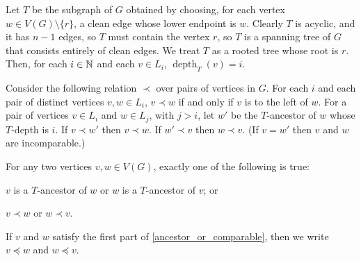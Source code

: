 \documentclass{patmorin}
\DeclareMathOperator{\depth}{depth}
\DeclareMathOperator{\pth}{path}
\begin{document}
Let $T$ be the subgraph of $G$ obtained by choosing, for each vertex $w\in V(G)\setminus\{r\}$, a clean edge whose lower endpoint is $w$.  Clearly $T$ is acyclic, and it has $n-1$ edges, so $T$ must contain the vertex $r$, so $T$ is a spanning tree of $G$ that consists entirely of clean edges.  We treat $T$ as a rooted tree whose root is $r$.  Then, for each $i\in\mathbb{N}$ and each $v\in L_i$, $\depth_T(v)=i$.


Consider the following relation $\prec$ over pairs of vertices in $G$. For each $i$ and each pair of distinct vertices $v,w\in L_i$, $v\prec w$ if and only if  $v$ is to the left of $w$.  For a pair of vertices $v\in L_i$ and $w\in L_j$, with $j>i$, let $w'$ be the $T$-ancestor of $w$ whose $T$-depth is $i$.  If $v\prec w'$ then $v\prec w$. If $w'\prec v$ then $w\prec v$. (If $v=w'$ then $v$ and $w$ are incomparable.)

%
%
%

\begin{obs}\label{ancestor_or_comparable}
  For any two vertices $v,w\in V(G)$, exactly one of the following is true:
  \begin{compactenum}
    \item $v$ is a $T$-ancestor of $w$ or $w$ is a $T$-ancestor of $v$; or
    \item $v\prec w$ or $w\prec v$.
  \end{compactenum}
\end{obs}
If $v$ and $w$ satisfy the first part of \cref{ancestor_or_comparable}, then we write $v\preceq w$ and $w\preceq v$.
\end{document}
